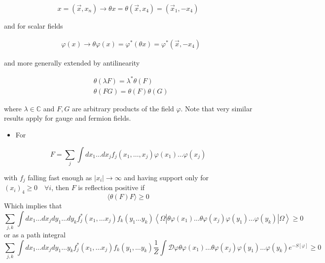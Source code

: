 \begin{equation}
x=\left(\vec{x}, x_{n}\right) \rightarrow \theta{x}=\theta\left(\vec{x}, x_{4}\right)=\left(\vec{x}_{1},-x_{4}\right)
\end{equation}

and for scalar fields

\begin{equation}
\begin{aligned}
& \varphi(x) \rightarrow \theta \varphi(x)=\varphi^{*}(\theta x)=\varphi^{*}\left(\vec{x},-x_{4}\right)
\end{aligned}
\end{equation}

and more generally extended by antilinearity

\begin{equation}
\begin{aligned}
& \theta(\lambda F)=\lambda^{*} \theta(F) \\
& \theta(F G)=\theta(F) \theta(G)
\end{aligned}
\end{equation}

where \(\lambda \in \mathbb{C}\) and \(F, G\) are arbitrary products of the field \(\varphi\).
%
Note that very similar results apply for gauge and fermion fields.

\begin{itemize}
  \item For
\end{itemize}

\begin{equation}
F=\sum_{j} \int d x_{1} \ldots d x_{j} f_{j}\left(x_{1}, \ldots, x_{j}\right) \varphi\left(x_{1}\right) \ldots \varphi\left(x_{j}\right)
\end{equation}

with $f_j$ falling fast enough as \(\left|x_{i}\right| \rightarrow \infty\) and having support only for \(\left(x_{i}\right)_{4} \geqslant 0 \quad \forall i\), then \(F\) is reflection positive if
\begin{equation}
\langle\theta(F) F\rangle \geqslant 0
\end{equation}
Which implies that
\begin{equation}
 \sum_{j, k} \int d x_{1} \ldots d x_j d y_{1} \ldots d y_{k} f_{j}^{*}\left(x_{1}, \ldots x_{j}\right) f_{k}\left(y_{1} \ldots y_{k}\right)\left\langle\Omega\left|\theta \varphi\left(x_{1}\right) \ldots \theta \varphi\left(x_{j}\right) \varphi\left(y_{1}\right) \ldots \varphi\left(y_{k}\right)\right| \Omega \right\rangle\geq 0 
\end{equation}
or as a path integral 
\begin{equation}
 \sum_{j,k} \int d x_{1} \ldots d x_{j} d y_{1} \ldots y_{k} f_{j}^{*}\left(x_{1}, \ldots x_{j}\right) f_{k}\left(y_{1}, \ldots y_{k}\right) \frac{1}{Z} \int \mathcal{D} \varphi \theta \varphi\left(x_{1}\right) \ldots \theta \varphi\left(x_{j}\right) \varphi\left(y_{1} \right) \ldots \varphi\left(y_{k}\right) e^{-S[\varphi]} \geqslant 0
 \label{eq:refpos_PI}
\end{equation}


